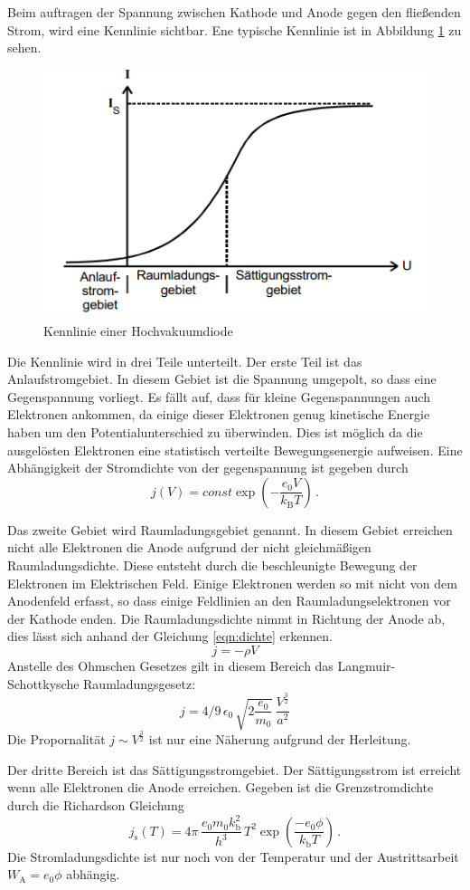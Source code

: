 Beim auftragen der Spannung zwischen Kathode und Anode gegen den fließenden Strom, wird eine Kennlinie sichtbar.
Ene typische Kennlinie ist in Abbildung \ref{fig:kennlinie} zu sehen.
\begin{figure}
    \centering
    \caption{Kennlinie einer Hochvakuumdiode \cite{v504}}
    \label{fig:kennlinie}
    \includegraphics[width = 0.5 \textwidth]{pics/kennlinie.png}
\end{figure}
Die Kennlinie wird in drei Teile unterteilt. 
Der erste Teil ist das Anlaufstromgebiet. In diesem Gebiet ist die Spannung umgepolt, so dass eine Gegenspannung vorliegt.
Es fällt auf, dass für kleine Gegenspannungen auch Elektronen ankommen, da einige dieser Elektronen genug kinetische Energie haben um den Potentialunterschied zu überwinden.
Dies ist möglich da die ausgelösten Elektronen eine statistisch verteilte Bewegungsenergie aufweisen. Eine Abhängigkeit der Stromdichte von der gegenspannung ist gegeben durch
\begin{equation}
    j(V)=const \exp\left(-\frac{e_0 V}{k_\text{B} T}\right) \, .
    \label{eqn:anlauf}
\end{equation}

Das zweite Gebiet wird Raumladungsgebiet genannt. In diesem Gebiet erreichen nicht alle Elektronen die Anode aufgrund der nicht gleichmäßigen Raumladungsdichte.
Diese entsteht durch die beschleunigte Bewegung der Elektronen im Elektrischen Feld. Einige Elektronen werden so mit nicht von dem Anodenfeld erfasst, so dass einige Feldlinien an den Raumladungselektronen vor der Kathode enden.
Die Raumladungsdichte nimmt in Richtung der Anode ab, dies lässt sich anhand der Gleichung \eqref{eqn:dichte} erkennen.
\begin{equation}
    j=- \rho V
    \label{eqn:dichte}
\end{equation}
Anstelle des Ohmschen Gesetzes gilt in diesem Bereich das Langmuir-Schottkysche Raumladungsgesetz:
\begin{equation}
    j=4/9 \, \epsilon_0\, \sqrt{2 \frac{e_0}{m_0}} \, \frac{V^{\frac{3}{2}}}{a^2}
\end{equation}
Die Propornalität $j \sim V^{\frac{3}{2}}$ ist nur eine Näherung aufgrund der Herleitung.

Der dritte Bereich ist das Sättigungsstromgebiet. Der Sättigungsstrom ist erreicht wenn alle Elektronen die Anode erreichen. Gegeben ist die Grenzstromdichte durch die Richardson Gleichung
\begin{equation}
    j_{\text{s}}(T)=4 \pi\, \frac{e_0 m_0 k_\text{b}^2}{h^3}\, T^2 \exp \left(\frac{-e_0 \phi}{k_\text{b} T}\right) \, .
    \label{eqn:richard}
\end{equation}
Die Stromladungsdichte ist nur noch von der Temperatur und der Austrittsarbeit $W_\text{A}=e_0 \phi$ abhängig.
